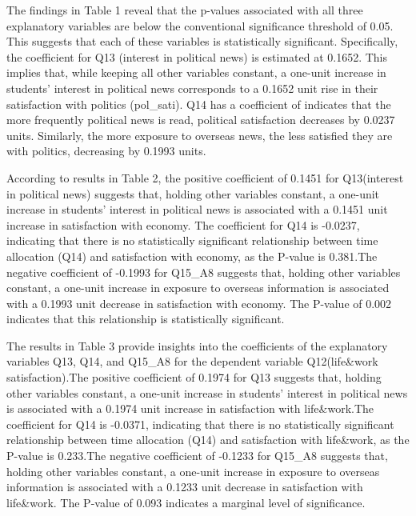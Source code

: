 \documentclass{article}
\begin{document}
The findings in Table 1 reveal that the p-values associated with all three explanatory variables are below the conventional significance threshold of 0.05. This suggests that each of these variables is statistically significant. Specifically, the coefficient for Q13 (interest in political news) is estimated at 0.1652. This implies that, while keeping all other variables constant, a one-unit increase in students' interest in political news corresponds to a 0.1652 unit rise in their satisfaction with politics (pol\_sati). Q14 has a coefficient of indicates that the more frequently political news is read, political satisfaction decreases by 0.0237 units. Similarly, the more exposure to overseas news, the less satisfied they are with politics, decreasing by 0.1993 units.
\vspace{\baselineskip}

According to results in Table 2, the positive coefficient of 0.1451 for Q13(interest in political news) suggests that, holding other variables constant, a one-unit increase in students' interest in political news is associated with a 0.1451 unit increase in satisfaction with economy. The coefficient for Q14 is -0.0237, indicating that there is no statistically significant relationship between time allocation (Q14) and satisfaction with economy, as the P-value is 0.381.The negative coefficient of -0.1993 for Q15\_A8 suggests that, holding other variables constant, a one-unit increase in exposure to overseas information is associated with a 0.1993 unit decrease in satisfaction with economy. The P-value of 0.002 indicates that this relationship is statistically significant.
\vspace{\baselineskip}

The results in Table 3 provide insights into the coefficients of the explanatory variables Q13, Q14, and Q15\_A8 for the dependent variable Q12(life\&work satisfaction).The positive coefficient of 0.1974 for Q13 suggests that, holding other variables constant, a one-unit increase in students' interest in political news is associated with a 0.1974 unit increase in satisfaction with life\&work.The coefficient for Q14 is -0.0371, indicating that there is no statistically significant relationship between time allocation (Q14) and satisfaction with life\&work, as the P-value is 0.233.The negative coefficient of -0.1233 for Q15\_A8 suggests that, holding other variables constant, a one-unit increase in exposure to overseas information is associated with a 0.1233 unit decrease in satisfaction with life\&work. The P-value of 0.093 indicates a marginal level of significance.
\newpage
\end{document}
